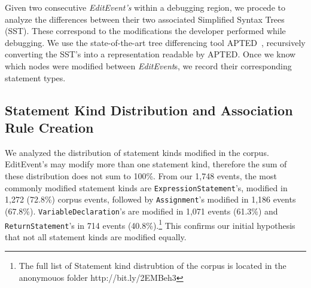 \documentclass[sigconf]{acmart}
\begin{document}
Given two consecutive \textit{EditEvent's} within
a debugging region, we procede to analyze the differences
between their two associated Simplified Syntax Trees (SST).
These correspond to the modifications the developer performed
while debugging.
We use the 
state-of-the-art tree differencing
tool APTED~\cite{Pawlik16Apted}, recursively converting the SST's into a
representation readable by APTED. 
Once we know which nodes were modified between \textit{EditEvent}s, we record
their corresponding statement types. 

\subsection{Statement Kind Distribution and Association Rule Creation}

We analyzed the distribution of statement kinds modified
in the corpus.  EditEvent's may modify more than one
statement kind, therefore the sum of these distribution
does not sum to 100\%.
From our 1,748 events, the most commonly modified statement
kinds are \texttt{ExpressionStatement}'s, modified in 1,272 (72.8\%) 
corpus events,
followed by \texttt{Assignment}'s modified in 1,186 
events (67.8\%). \texttt{VariableDeclaration}'s are modified in 1,071
events (61.3\%) and \texttt{ReturnStatement}'s in 714
events (40.8\%).\footnote{The full list of Statement kind
distrubtion of the corpus is located in the anonymouos folder 
http://bit.ly/2EMBeh3} This confirms our initial hypothesis that
not all statement kinds are modified equally.


\end{document}
